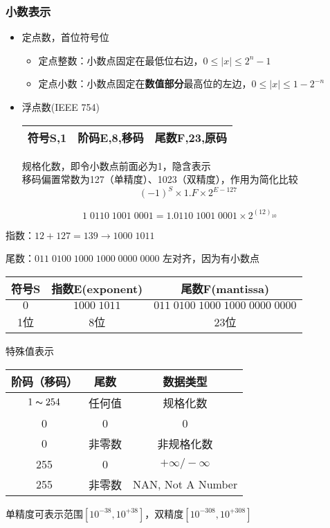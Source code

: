 \subsubsection{小数表示}
\begin{itemize}
\item 定点数，首位符号位
\begin{itemize}
	\item 定点整数：小数点固定在最低位右边，$0\leq|x|\leq 2^n-1$
	\item 定点小数：小数点固定在\textbf{数值部分}最高位的左边，$0\leq|x|\leq 1-2^{-n}$
\end{itemize}
\item 浮点数(IEEE 754)
\begin{center}
\begin{tabular}{|c|c|c|}\hline
符号S,1 & 阶码E,8,移码 & 尾数F,23,原码
\\\hline
\end{tabular}
\end{center}
规格化数，即令小数点前面必为1，隐含表示\\
移码偏置常数为127（单精度）、1023（双精度），作用为简化比较
\[(-1)^S\times1.F\times 2^{E-127}\]
\end{itemize}
\begin{example}
\[1\;0110\;1001\;0001=1.0110\;1001\;0001\times 2^{(12)_{10}}\]
\par 指数：$12+127=139\to 1000\;1011$
\par 尾数：$011\;0100\;1000\;1000\;0000\;0000$ 左对齐，因为有小数点
\begin{center}
\begin{tabular}[htbp]{|c|c|c|}
\hline
符号S & 指数E(exponent) & 尾数F(mantissa)\\\hline
$0$ & $1000\;1011$ & $011\;0100\;1000\;1000\;0000\;0000$\\\hline
1位 & 8位 & 23位\\\hline
\end{tabular}
\end{center}
\end{example}
特殊值表示
\begin{center}
\begin{tabular}{ccc}
阶码（移码） & 尾数 & 数据类型\\\hline
$1\thicksim 254$ & 任何值 & 规格化数\\
0 & 0 & 0\\
0 & 非零数 & 非规格化数\\
255 & 0 & $+\infty/-\infty$\\
255 & 非零数 & NAN, Not A Number
\end{tabular}
\end{center}
单精度可表示范围$[10^{-38},10^{+38}]$，双精度$[10^{-308},10^{+308}]$

